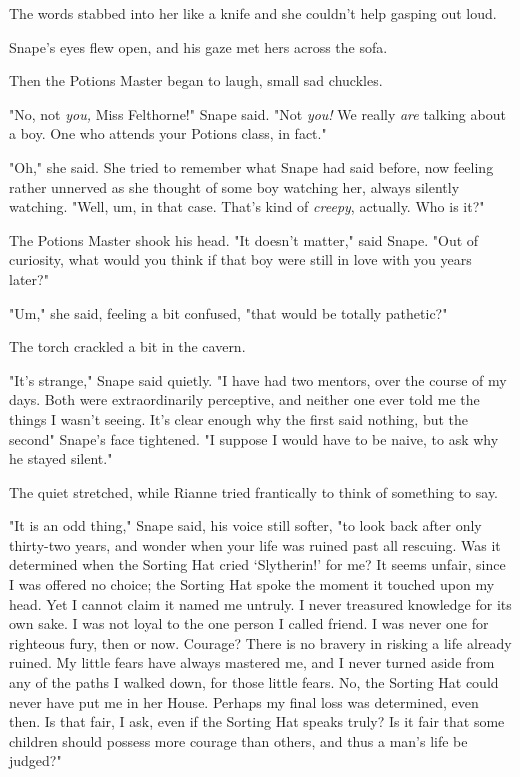 The words stabbed into her like a knife and she couldn't help gasping out loud.

Snape's eyes flew open, and his gaze met hers across the sofa.

Then the Potions Master began to laugh, small sad chuckles.

"No, not \emph{you,} Miss Felthorne!" Snape said. "Not \emph{you!} We really
\emph{are} talking about a boy. One who attends your Potions class, in fact."

"Oh," she said. She tried to remember what Snape had said before, now feeling
rather unnerved as she thought of some boy watching her, always silently
watching. "Well, um, in that case. That's kind of \emph{creepy}, actually. Who
is it?"

The Potions Master shook his head. "It doesn't matter," said Snape. "Out of
curiosity, what would you think if that boy were still in love with you years
later?"

"Um," she said, feeling a bit confused, "that would be totally pathetic?"

The torch crackled a bit in the cavern.

"It's strange," Snape said quietly. "I have had two mentors, over the course of
my days. Both were extraordinarily perceptive, and neither one ever told me the
things I wasn't seeing. It's clear enough why the first said nothing, but the
second{\el}" Snape's face tightened. "I suppose I would have to be naive, to
ask why he stayed silent."

The quiet stretched, while Rianne tried frantically to think of something to
say.

"It is an odd thing," Snape said, his voice still softer, "to look back after
only thirty-two years, and wonder when your life was ruined past all rescuing.
Was it determined when the Sorting Hat cried `Slytherin!' for me? It seems
unfair, since I was offered no choice; the Sorting Hat spoke the moment it
touched upon my head. Yet I cannot claim it named me untruly. I never treasured
knowledge for its own sake. I was not loyal to the one person I called friend.
I was never one for righteous fury, then or now. Courage? There is no bravery
in risking a life already ruined. My little fears have always mastered me, and
I never turned aside from any of the paths I walked down, for those little
fears. No, the Sorting Hat could never have put me in her House. Perhaps my
final loss was determined, even then. Is that fair, I ask, even if the Sorting
Hat speaks truly? Is it fair that some children should possess more courage
than others, and thus a man's life be judged?"

